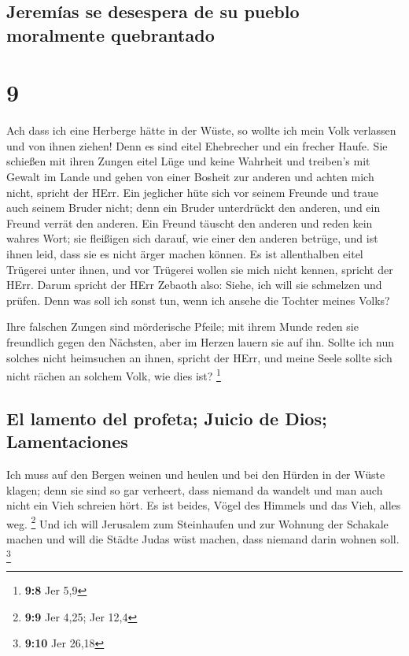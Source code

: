\hypertarget{jeremuxedas-se-desespera-de-su-pueblo-moralmente-quebrantado}{%
\subsection{Jeremías se desespera de su pueblo moralmente
quebrantado}\label{jeremuxedas-se-desespera-de-su-pueblo-moralmente-quebrantado}}

\hypertarget{section-8}{%
\section{9}\label{section-8}}

 Ach dass ich eine Herberge hätte in der Wüste, so wollte
ich mein Volk verlassen und von ihnen ziehen! Denn es sind eitel
Ehebrecher und ein frecher Haufe.  Sie schießen mit ihren
Zungen eitel Lüge und keine Wahrheit und treiben's mit Gewalt im Lande
und gehen von einer Bosheit zur anderen und achten mich nicht, spricht
der HErr.  Ein jeglicher hüte sich vor seinem Freunde und
traue auch seinem Bruder nicht; denn ein Bruder unterdrückt den anderen,
und ein Freund verrät den anderen.  Ein Freund täuscht den
anderen und reden kein wahres Wort; sie fleißigen sich darauf, wie einer
den anderen betrüge, und ist ihnen leid, dass sie es nicht ärger machen
können.  Es ist allenthalben eitel Trügerei unter ihnen,
und vor Trügerei wollen sie mich nicht kennen, spricht der HErr.
 Darum spricht der HErr Zebaoth also: Siehe, ich will sie
schmelzen und prüfen. Denn was soll ich sonst tun, wenn ich ansehe die
Tochter meines Volks?

 Ihre falschen Zungen sind mörderische Pfeile; mit ihrem
Munde reden sie freundlich gegen den Nächsten, aber im Herzen lauern sie
auf ihn.  Sollte ich nun solches nicht heimsuchen an
ihnen, spricht der HErr, und meine Seele sollte sich nicht rächen an
solchem Volk, wie dies ist? \footnote{\textbf{9:8} Jer 5,9}

\hypertarget{el-lamento-del-profeta-juicio-de-dios-lamentaciones}{%
\subsection{El lamento del profeta; Juicio de Dios;
Lamentaciones}\label{el-lamento-del-profeta-juicio-de-dios-lamentaciones}}

 Ich muss auf den Bergen weinen und heulen und bei den
Hürden in der Wüste klagen; denn sie sind so gar verheert, dass niemand
da wandelt und man auch nicht ein Vieh schreien hört. Es ist beides,
Vögel des Himmels und das Vieh, alles weg. \footnote{\textbf{9:9} Jer
  4,25; Jer 12,4}  Und ich will Jerusalem zum Steinhaufen
und zur Wohnung der Schakale machen und will die Städte Judas wüst
machen, dass niemand darin wohnen soll. \footnote{\textbf{9:10} Jer
  26,18}

